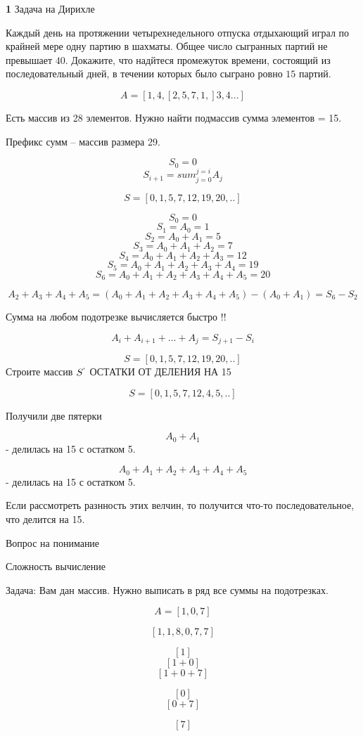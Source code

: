 \documentclass{article}
\begin{document}
\textbf{1}
Задача на Дирихле

Каждый день на протяжении четырехнедельного отпуска отдыхающий играл по крайней мере одну партию в шахматы. Общее число сыгранных партий не превышает $40$. Докажите, что надйтеся промежуток времени, состоящий из последовательный дней, в течении которых было сыграно ровно  $15 $ партий. 

$$A = [1, 4, [2, 5, 7, 1,] 3, 4  ... ]$$

Есть массив из 28 элементов. Нужно найти подмассив сумма элементов = 15.

Префикс сумм -- массив размера 29.

$$S_0 = 0$$
$$ S_{i + 1} = sum_{j = 0}^{j = i} A_j$$ 

$$ S = [0, 1, 5, 7, 12, 19, 20, .. ] $$ 

$$ S_0 = 0$$
$$S_1 = A_0 = 1$$
$$S_2 = A_0 + A_1 = 5$$
$$S_3 = A_0 + A_1 + A_2 = 7$$
$$S_4 = A_0 + A_1 + A_2 + A_3 = 12$$
$$S_5 = A_0 + A_1 + A_2 + A_3 + A_4 = 19$$
$$S_6 = A_0 + A_1 + A_2 + A_3 + A_4 + A_5= 20$$


$$ A_2 + A_3 + A_4  + A_5 = (A_0 + A_1 + A_2 + A_3 + A_4 + A_5) - (A_0 + A_1 ) = S_6 - S_2$$

Сумма на любом подотрезке вычисляется быстро !!


$$ A_i + A_{i + 1} + ... + A_{j} = S_{j + 1} - S_i$$

$$ S = [0, 1, 5, 7, 12, 19, 20, .. ] $$ 
Строите массив $S^`$ ОСТАТКИ ОТ ДЕЛЕНИЯ НА 15

$$ S = [0, 1, 5, 7, 12, 4, 5, .. ] $$ 

Получили две пятерки

$$ A_0 + A_1 $$ - делилась на 15 с остатком 5.

$$A_0 + A_1 + A_2 + A_3 + A_4 + A_5$$ - делилась на 15 с остатком 5.

Если рассмотреть разнность этих велчин, то получится что-то последовательное, что делится на 15.

\newpage

Вопрос на понимание

Сложность вычисление 

Задача: Вам дан массив. Нужно выписать в ряд все суммы на подотрезках. 

$$ A = [1, 0, 7]$$

$$[1, 1, 8, 0, 7, 7]$$

$$[1]$$
$$[1 + 0]$$
$$[1 + 0 + 7]$$

$$[0]$$
$$[0 + 7]$$

$$[7]$$
\end{document}
